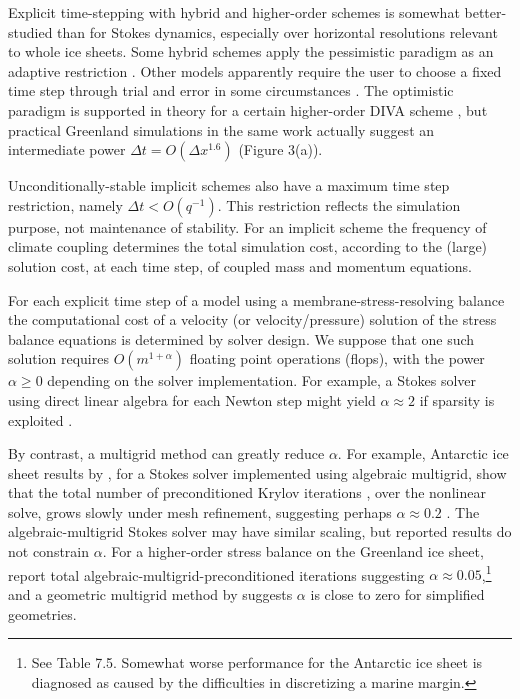 \documentclass[twocolumn,letterpaper]{igs}
\begin{document}
Explicit time-stepping with hybrid and higher-order schemes is somewhat better-studied than for Stokes dynamics, especially over horizontal resolutions relevant to whole ice sheets.  Some hybrid schemes apply the pessimistic paradigm as an adaptive restriction \citep{Winkelmannetal2011}.  Other models apparently require the user to choose a fixed time step through trial and error in some circumstances \citep[for example]{Fischleretal2022,Robinsonetal2022}.  The optimistic paradigm is supported in theory for a certain higher-order DIVA scheme \citep[see equation (52)]{Robinsonetal2022}, but practical Greenland simulations in the same work actually suggest an intermediate power $\Delta t = O(\Delta x^{1.6})$ (Figure 3(a)).

Unconditionally-stable implicit schemes also have a maximum time step restriction, namely $\Delta t < O(q^{-1})$.  This restriction reflects the simulation purpose, not maintenance of stability.  For an implicit scheme the frequency of climate coupling determines the total simulation cost, according to the (large) solution cost, at each time step, of coupled mass and momentum equations.

For each explicit time step of a model using a membrane-stress-resolving balance the computational cost of a velocity (or velocity/pressure) solution of the stress balance equations is determined by solver design.  We suppose that one such solution requires $O(m^{1+\alpha})$ floating point operations (flops),  with the power $\alpha\ge 0$ depending on the solver implementation.  For example, a Stokes solver using direct linear algebra for each Newton step might yield $\alpha \approx 2$ if sparsity is exploited \citep{Bueler2021}.


By contrast, a multigrid method \citep{Trottenbergetal2001} can greatly reduce $\alpha$.  For example, Antarctic ice sheet results by \cite{IsaacStadlerGhattas2015}, for a Stokes solver implemented using algebraic multigrid, show that the total number of preconditioned Krylov iterations \citep{Bueler2021}, over the nonlinear solve, grows slowly under mesh refinement, suggesting perhaps $\alpha\approx 0.2$ \citep[Table 8.1]{IsaacStadlerGhattas2015}.  The \cite{Lengetal2012} algebraic-multigrid Stokes solver may have similar scaling, but reported results do not constrain $\alpha$.  For a higher-order stress balance on the Greenland ice sheet, \cite{Tuminaroetal2016} report total algebraic-multigrid-preconditioned iterations suggesting $\alpha \approx 0.05$,\footnote{See Table 7.5.  Somewhat worse performance for the Antarctic ice sheet is diagnosed as caused by the difficulties in discretizing a marine margin.} and a geometric multigrid method by \citep{BrownSmithAhmadia2013} suggests $\alpha$ is close to zero for simplified geometries.
\end{document}
